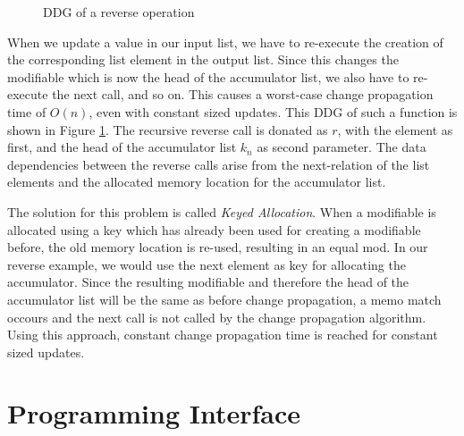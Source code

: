\begin{figure}
\begin{center}
\end{center}
\caption{DDG of a reverse operation}
\label{fig:reverse_ddg}
\end{figure}

When we update a value in our input list, we have to re-execute the creation of the corresponding list element in the output list. Since this changes the modifiable which is now the head of the accumulator list, we also have to re-execute the next call, and so on. This causes a worst-case change propagation time of $O(n)$, even with constant sized updates. This DDG of such a function is shown in Figure \ref{fig:reverse_ddg}. The recursive reverse call is donated as $r$, with the element as first, and the head of the accumulator list $k_n$ as second parameter. The data dependencies between the reverse calls arise from the next-relation of the list elements and the allocated memory location for the accumulator list. 

The solution for this problem is called \textit{Keyed Allocation}. When a modifiable is allocated using a key which has already been used for creating a modifiable before, the old memory location is re-used, resulting in an equal mod. In our reverse example, we would use the next element as key for allocating the accumulator. Since the resulting modifiable and therefore the head of the accumulator list will be the same as before change propagation, a memo match occours and the next call is not called by the change propagation algorithm. Using this approach, constant change propagation time is reached for constant sized updates. 

\section{Programming Interface}

